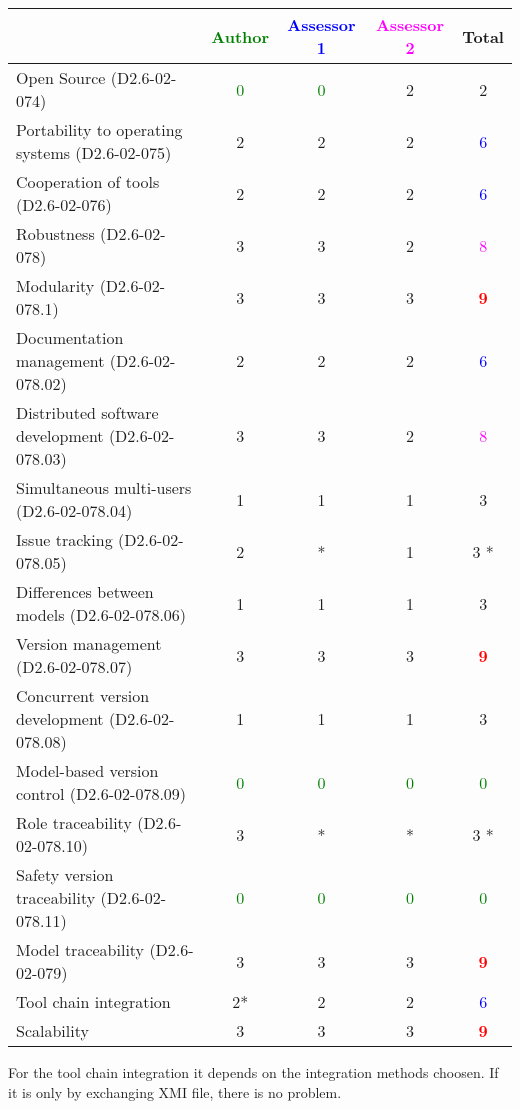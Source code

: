 \begin{tabular}{|l | c | c | c | c|}
\hline
& \textcolor{green}{Author} & \textcolor{blue}{Assessor 1} & \textcolor{magenta}{Assessor 2} & Total \\
\hline 
Open Source (D2.6-02-074) & \textcolor{green}{0}   & \textcolor{green}{0} & 2   & 2     \\
\hline 
Portability to operating systems (D2.6-02-075) &2 & 2   & 2    & \textcolor{blue}{6}  \\
\hline
Cooperation of tools (D2.6-02-076) &2 & 2   &2 & \textcolor{blue}{6}  \\
\hline
Robustness (D2.6-02-078) &3 &3 &2 & \textcolor{magenta}{8} \\
\hline
Modularity (D2.6-02-078.1) &3 &3 &3 & \textcolor{red}{\textbf{9}} \\
\hline
Documentation management (D2.6-02-078.02) & 2   & 2   &2 & \textcolor{blue}{6} \\
\hline
Distributed software development (D2.6-02-078.03)  &3 & 3   &2 & \textcolor{magenta}{8} \\
\hline
Simultaneous multi-users (D2.6-02-078.04)   &1 & 1   &1 & 3    \\
\hline
Issue tracking (D2.6-02-078.05) &2 & *& 1   & 3   * \\
\hline
Differences between models (D2.6-02-078.06) &1 & 1   &1 & 3    \\
\hline
Version management (D2.6-02-078.07) &3 & 3   & 3   & \textcolor{red}{\textbf{9}} \\
\hline
Concurrent version development (D2.6-02-078.08) &1 & 1   & 1   & 3    \\
\hline
Model-based version control (D2.6-02-078.09) & \textcolor{green}{0}   & \textcolor{green}{0} & \textcolor{green}{0} & \textcolor{green}{0} \\
\hline
Role traceability (D2.6-02-078.10) & 3   & *& * & 3   * \\
\hline
Safety version traceability (D2.6-02-078.11) & \textcolor{green}{0}   & \textcolor{green}{0}   & \textcolor{green}{0} & \textcolor{green}{0} \\
\hline
Model traceability (D2.6-02-079) &3 & 3   &3 & \textcolor{red}{\textbf{9}} \\
\hline
Tool chain integration &2* & 2   & 2    & \textcolor{blue}{6} \\
\hline
Scalability &3 & 3   &3 & \textcolor{red}{\textbf{9}} \\
\hline
\end{tabular}
\begin{author_comment}
For the tool chain integration it depends on the integration methods
choosen. If it is only by exchanging XMI file, there is no problem.
\end{author_comment}

